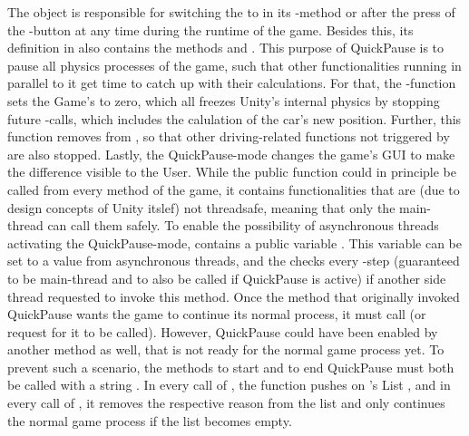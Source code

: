 The object  is responsible for switching the  to  in its -method or after the press of the -button at any time during the runtime of the game. Besides this, its definition in  also contains the methods  and . This purpose of QuickPause is to pause all physics processes of the game, such that other functionalities running in parallel to it get time to catch up with their calculations. For that, the -function sets the Game's  to zero, which all freezes Unity's internal physics by stopping future -calls, which includes the calulation of the car's new position. Further, this function removes  from , so that other driving-related functions not triggered by  are also stopped. Lastly, the QuickPause-mode changes the game's GUI to make the difference visible to the User. While the public function  could in principle be called from every method of the game, it contains functionalities that are (due to design concepts of Unity itslef) not threadsafe, meaning that only the main-thread can call them safely. To enable the possibility of asynchronous threads activating the QuickPause-mode,  contains a public variable . This variable can be set to a value from asynchronous threads, and the  checks every -step (guaranteed to be main-thread and to also be called if QuickPause is active) if another side thread requested to invoke this method.
Once the method that originally invoked QuickPause wants the game to continue its normal process, it must call  (or request for it to be called). However, QuickPause could have been enabled by another method as well, that is not ready for the normal game process yet. To prevent such a scenario, the methods to start and to end QuickPause must both be called with a string . In every call of , the function pushes  on 's List , and in every call of , it removes the respective reason from the list and only continues the normal game process if the list becomes empty.

